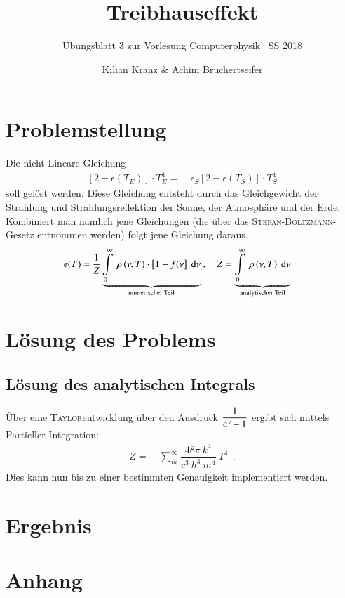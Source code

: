 \documentclass[12pt,a4paper,titlepage]{scrreprt}
\author{Kilian Kranz \& Achim Bruchertseifer}
\title{Treibhauseffekt}
\subtitle{Übungsblatt 3 zur Vorlesung \glqq Computerphysik\grqq~ SS 2018}
\begin{document}
	\maketitle
	\setcounter{chapter}{3}

	\section{Problemstellung}
	Die nicht-Lineare Gleichung
	\begin{align}
		\left[2-\epsilon\left(T_E\right)\right]\cdot T_E^4=&~\epsilon_S\left[2-\epsilon\left(T_S\right)\right]\cdot T_S^4
	\end{align}
	soll gelöst werden. Diese Gleichung entsteht durch das Gleichgewicht der Strahlung und Strahlungsreflektion der Sonne, der Atmosphäre und der Erde. Kombiniert man nämlich jene Gleichungen (die über das \textsc{Stefan-Boltzmann}-Gesetz entnommen werden) folgt jene Gleichung daraus.
	\begin{align}
	\epsilon(T)=&~\dfrac{1}{Z}\underbrace{\int\limits_0^\infty~\rho\left(\nu,T\right)\cdot\left[1-f(\nu\right]~\dif\nu}_{\text{numerischer Teil}}~,~~~~Z=\underbrace{\int\limits_0^\infty~\rho\left(\nu,T\right)~\dif\nu}_{\text{analytischer Teil}}
	\end{align}
	
	\section{Lösung des Problems}
	\subsection{Lösung des analytischen Integrals}
	Über eine \textsc{Taylor}entwicklung über den Ausdruck $\dfrac{1}{\mathrm{e}^x-1}$ ergibt sich mittels Partieller Integration:
	\begin{align}
		Z=&~\sum_{m}^{\infty}\dfrac{48\pi~k^4}{c^3~h^3~m^4}~T^4~~.
	\end{align}
	Dies kann nun bis zu einer bestimmten Genauigkeit implementiert werden.
	
	\section{Ergebnis}
	

	
	\section{Anhang}

	
\end{document}
